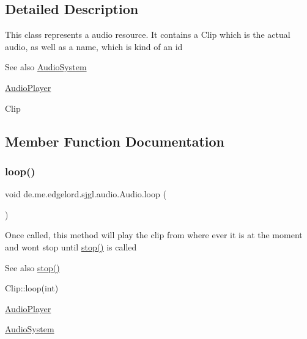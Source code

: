 \subsection{Detailed Description}
This class represents a audio resource. It contains a Clip which is the actual audio, as well as a name, which is kind of an id

\begin{DoxySeeAlso}{See also}
\mbox{\hyperlink{classde_1_1me_1_1edgelord_1_1sjgl_1_1audio_1_1_audio_system}{Audio\+System}} 

\mbox{\hyperlink{classde_1_1me_1_1edgelord_1_1sjgl_1_1audio_1_1_audio_player}{Audio\+Player}} 

Clip 
\end{DoxySeeAlso}


\subsection{Member Function Documentation}
\mbox{\label{classde_1_1me_1_1edgelord_1_1sjgl_1_1audio_1_1_audio_a654692b8ee1f0d298af938b2c76e6a54}} 
\subsubsection{\texorpdfstring{loop()}{loop()}}
{\footnotesize\ttfamily void de.\+me.\+edgelord.\+sjgl.\+audio.\+Audio.\+loop (\begin{DoxyParamCaption}{ }\end{DoxyParamCaption})}

Once called, this method will play the clip from where ever it is at the moment and won\textquotesingle{}t stop until {\ttfamily \mbox{\hyperlink{classde_1_1me_1_1edgelord_1_1sjgl_1_1audio_1_1_audio_a2e9d9c2e43c4bab399c7f360c8f90ce2}{stop()}}} is called

\begin{DoxySeeAlso}{See also}
\mbox{\hyperlink{classde_1_1me_1_1edgelord_1_1sjgl_1_1audio_1_1_audio_a2e9d9c2e43c4bab399c7f360c8f90ce2}{stop()}} 

Clip\+::loop(int) 

\mbox{\hyperlink{classde_1_1me_1_1edgelord_1_1sjgl_1_1audio_1_1_audio_player}{Audio\+Player}} 

\mbox{\hyperlink{classde_1_1me_1_1edgelord_1_1sjgl_1_1audio_1_1_audio_system}{Audio\+System}} 
\end{DoxySeeAlso}
\mbox{\label{classde_1_1me_1_1edgelord_1_1sjgl_1_1audio_1_1_audio_ac87651401394ee2e141c099a175cd7cb}} 
